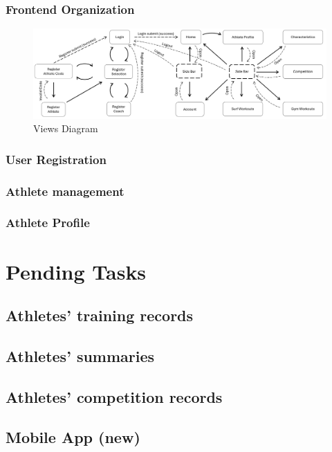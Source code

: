 \documentclass[a4paper,twoside,11pt]{article}
\begin{document}
\subsubsection{Frontend Organization}

\begin{figure}[H]
\centering
\includegraphics[width=5in]{ViewsDiagram.png}
\caption{Views Diagram}
\end{figure}

\subsubsection{User Registration}
\subsubsection{Athlete management}
\subsubsection{Athlete Profile}


\section{Pending Tasks}
\subsection{Athletes' training records}
\subsection{Athletes' summaries}
\subsection{Athletes' competition records}
\subsection{Mobile App (new)}

% 
% 
\end{document}
